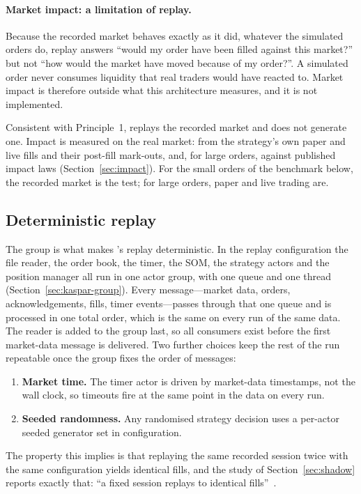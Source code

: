 \paragraph{Market impact: a limitation of replay.} Because the recorded
market behaves exactly as it did, whatever the simulated orders do, replay answers ``would my order have
been filled against this market?'' but not ``how would the market have moved because of my order?''. A
simulated order never consumes liquidity that real traders would have reacted to. Market impact is
therefore outside what this architecture measures, and it is not implemented.

Consistent with Principle~1, \kasparhft{} replays the recorded market and does not generate one. Impact is measured on
the real market: from the strategy's own paper and live fills and
their post-fill mark-outs, and, for large orders, against published impact laws (Section~\ref{sec:impact}). For the
small orders of the benchmark below, the recorded market is the test; for large orders, paper and live trading are.


\subsection{Deterministic replay}
\label{sec:kaspar-determinism}

The group is what makes \kasparhft{}'s replay deterministic. In the replay configuration the file reader, the order book,
the timer, the SOM, the strategy actors and the position manager all run in one actor group, with one queue and one
thread (Section~\ref{sec:kaspar-group}). Every message---market data, orders, acknowledgements, fills, timer
events---passes through that one queue and is processed in one total order, which is the same on every run of the
same data. The reader is added to the group last, so all consumers exist before the first market-data message is
delivered. Two further choices keep the rest of the run repeatable once the group fixes the order of messages:
\begin{enumerate}[leftmargin=1.5em]
\item \textbf{Market time.} The timer actor is driven by market-data timestamps, not the wall
  clock, so timeouts fire at the same point in the data on every run.
\item \textbf{Seeded randomness.} Any randomised strategy decision uses a per-actor seeded
  generator set in configuration.
\end{enumerate}
The property this implies is that replaying the same recorded session twice with the same configuration yields
identical fills, and the study of Section~\ref{sec:shadow} reports exactly that: ``a fixed session replays to
identical fills''~\citep{maciejewski_shadow}.

